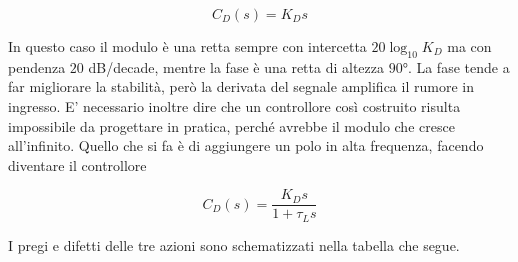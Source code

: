 	   		\begin{equation*}
	   			C_D(s)=K_Ds
	   		\end{equation*} 
	   		
	   		\noindent In questo caso il modulo è una retta sempre con intercetta $20\log_{10}K_D$ ma con pendenza $20$ dB/decade, mentre la fase è una retta di altezza $90°$. La fase tende a far migliorare la stabilità, però la derivata del segnale amplifica il rumore in ingresso. E' necessario inoltre dire che un controllore così costruito risulta impossibile da progettare in pratica, perché avrebbe il modulo che cresce all'infinito. Quello che si fa è di aggiungere un polo in alta frequenza, facendo diventare il controllore
	   		
	   		\begin{equation*}
	   			C_D(s)=\frac{K_Ds}{1+\tau_Ls}
	   		\end{equation*} 	 
	
		\noindent I pregi e difetti delle tre azioni sono schematizzati nella tabella che segue.	
	
